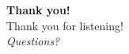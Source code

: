 \documentclass[aspectratio=169, 11pt]{beamer}
\begin{document}

\begin{frame}[plain]
    \begin{center}
        \vspace{2em}
        {\Large \textbf{Thank you!}} \\[2em]
        {\large Thank you for listening!} \\[2em]
        \textit{Questions?}
    \end{center}
\end{frame}


\appendix
\end{document}
